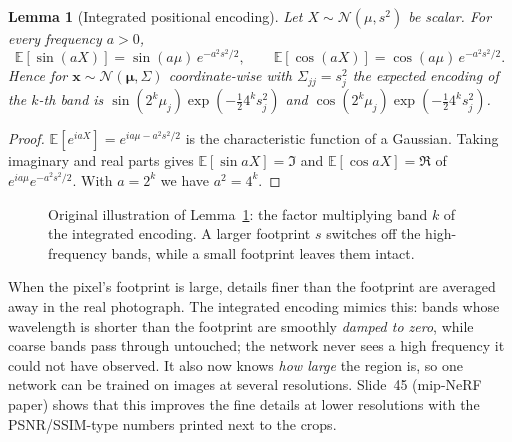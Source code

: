 \documentclass[11pt,a4paper]{article}
\newcommand{\E}{\mathbb{E}}
\theoremstyle{definition}
\theoremstyle{plain}
\newtheorem{lemma}{Lemma}[section]
\begin{document}
\begin{lemma}[Integrated positional encoding]\label{lem:ipe}
Let $X\sim\mathcal N(\mu,s^2)$ be scalar. For every frequency $a>0$,
\[
\E[\sin(aX)]=\sin(a\mu)\,e^{-a^2s^2/2},\qquad\E[\cos(aX)]=\cos(a\mu)\,e^{-a^2s^2/2}.
\]
Hence for $\boldsymbol x\sim\mathcal N(\boldsymbol\mu,\Sigma)$ coordinate-wise with $\Sigma_{jj}=s_j^2$ the expected encoding of the $k$-th band is $\sin(2^k\mu_j)\exp(-\tfrac12 4^ks_j^2)$ and $\cos(2^k\mu_j)\exp(-\tfrac12 4^ks_j^2)$.
\end{lemma}
\begin{proof}
$\E[e^{iaX}]=e^{ia\mu-a^2s^2/2}$ is the characteristic function of a Gaussian. Taking imaginary and real parts gives $\E[\sin aX]=\Im$ and $\E[\cos aX]=\Re$ of $e^{ia\mu}e^{-a^2s^2/2}$. With $a=2^k$ we have $a^2=4^k$.
\end{proof}

\begin{figure}[H]
\centering
{}
\caption{Original illustration of Lemma~\ref{lem:ipe}: the factor multiplying band $k$ of the integrated encoding. A larger footprint $s$ switches off the high-frequency bands, while a small footprint leaves them intact.}
\end{figure}

\begin{intuition}
When the pixel's footprint is large, details finer than the footprint are averaged away in the real photograph. The integrated encoding mimics this: bands whose wavelength is shorter than the footprint are smoothly \emph{damped to zero}, while coarse bands pass through untouched; the network never sees a high frequency it could not have observed. It also now knows \emph{how large} the region is, so one network can be trained on images at several resolutions. Slide~45 (mip-NeRF paper) shows that this improves the fine details at lower resolutions with the PSNR/SSIM-type numbers printed next to the crops.
\end{intuition}
\end{document}
